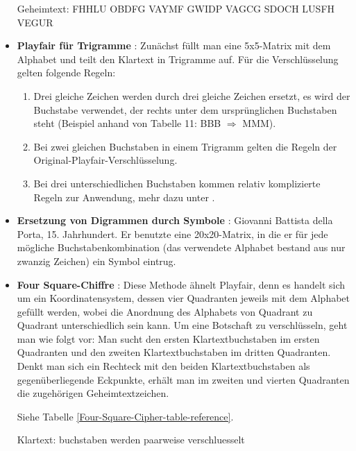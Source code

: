 \begin{refsegment}
\begin{itemize}
   Geheimtext: FHHLU OBDFG VAYMF GWIDP VAGCG SDOCH LUSFH VEGUR\\


\item \textbf{Playfair für Trigramme} \cite{Savard1999}:
Zunächst füllt man eine 5x5-Matrix mit dem Alphabet und teilt den Klartext
in Trigramme auf. Für die Verschlüsselung gelten folgende Regeln:
   \begin{enumerate}
      \item Drei gleiche Zeichen werden durch drei gleiche Zeichen ersetzt,
         es wird der Buchstabe verwendet, der rechts unter dem ursprünglichen
         Buchstaben steht (Beispiel anhand von Tabelle 11:
         BBB $ \Rightarrow $ MMM).
      \item Bei zwei gleichen Buchstaben in einem Trigramm gelten die Regeln
         der Original-Playfair-Verschlüsselung.
      \item Bei drei unterschiedlichen Buchstaben kommen relativ komplizierte
         Regeln zur Anwendung, mehr dazu unter \cite{Savard1999}.
   \end{enumerate}


\item \textbf{Ersetzung von Digrammen durch Symbole} \cite{Savard1999}:
   Giovanni Battista della Porta, 15. Jahrhundert. Er benutzte eine
   20x20-Matrix, in die er für jede mögliche Buchstabenkombination (das
   verwendete Alphabet bestand aus nur zwanzig Zeichen) ein Symbol eintrug.


\item \textbf{Four Square-Chiffre} \cite{Savard1999}:
   Diese Methode ähnelt Playfair, denn es handelt sich um ein
   Koordinatensystem, dessen vier Quadranten jeweils mit dem Alphabet gefüllt
   werden, wobei die Anordnung des Alphabets von Quadrant zu Quadrant
   unterschiedlich sein kann. Um eine Botschaft zu verschlüsseln, geht man wie
   folgt vor:
   Man sucht den ersten Klartextbuchstaben im ersten Quadranten und den zweiten
   Klartextbuchstaben im dritten Quadranten. Denkt man sich ein Rechteck mit
   den beiden Klartextbuchstaben als gegenüberliegende Eckpunkte, erhält man
   im zweiten und vierten Quadranten die zugehörigen Geheimtextzeichen.

   Siehe Tabelle \ref{Four-Square-Cipher-table-reference}.

   Klartext: buchstaben werden paarweise verschluesselt


\end{itemize}
\end{refsegment}
